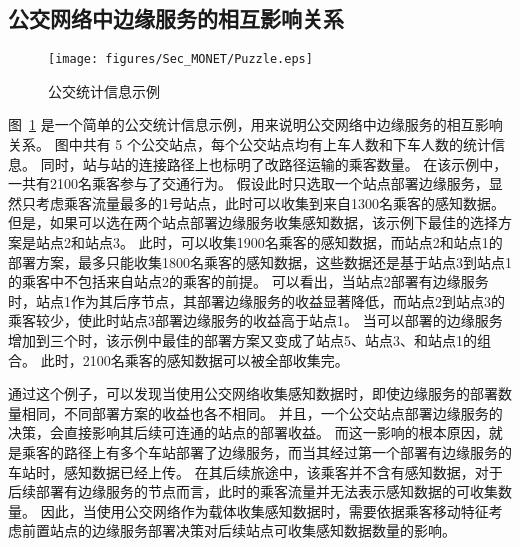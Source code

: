 


\subsection{公交网络中边缘服务的相互影响关系}

\begin{figure}[!b]
  \centering
  \texttt{[image: figures/Sec\_MONET/Puzzle.eps]}
  \caption{公交统计信息示例}
  \label{Figure_puzzle}
\end{figure}

图~\ref{Figure_puzzle} 是一个简单的公交统计信息示例，用来说明公交网络中边缘服务的相互影响关系。
图中共有 5 个公交站点，每个公交站点均有上车人数和下车人数的统计信息。
同时，站与站的连接路径上也标明了改路径运输的乘客数量。
在该示例中，一共有2100名乘客参与了交通行为。
假设此时只选取一个站点部署边缘服务，显然只考虑乘客流量最多的1号站点，此时可以收集到来自1300名乘客的感知数据。
但是，如果可以选在两个站点部署边缘服务收集感知数据，该示例下最佳的选择方案是站点2和站点3。
此时，可以收集1900名乘客的感知数据，而站点2和站点1的部署方案，最多只能收集1800名乘客的感知数据，这些数据还是基于站点3到站点1的乘客中不包括来自站点2的乘客的前提。
可以看出，当站点2部署有边缘服务时，站点1作为其后序节点，其部署边缘服务的收益显著降低，而站点2到站点3的乘客较少，使此时站点3部署边缘服务的收益高于站点1。
当可以部署的边缘服务增加到三个时，该示例中最佳的部署方案又变成了站点5、站点3、和站点1的组合。
此时，2100名乘客的感知数据可以被全部收集完。

通过这个例子，可以发现当使用公交网络收集感知数据时，即使边缘服务的部署数量相同，不同部署方案的收益也各不相同。
并且，一个公交站点部署边缘服务的决策，会直接影响其后续可连通的站点的部署收益。
而这一影响的根本原因，就是乘客的路径上有多个车站部署了边缘服务，而当其经过第一个部署有边缘服务的车站时，感知数据已经上传。
在其后续旅途中，该乘客并不含有感知数据，对于后续部署有边缘服务的节点而言，此时的乘客流量并无法表示感知数据的可收集数量。
因此，当使用公交网络作为载体收集感知数据时，需要依据乘客移动特征考虑前置站点的边缘服务部署决策对后续站点可收集感知数据数量的影响。


